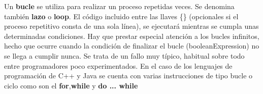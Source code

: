 Un \textbf{bucle} se utiliza para realizar un proceso repetidas veces. Se denomina también \textbf{lazo} o \textbf{loop}. El
código incluido entre las llaves \{\} (opcionales si el proceso repetitivo consta de una sola línea), se
ejecutará mientras se cumpla unas determinadas condiciones. Hay que prestar especial atención a
los bucles infinitos, hecho que ocurre cuando la condición de finalizar el bucle
(booleanExpression) no se llega a cumplir nunca. Se trata de un fallo muy típico, habitual sobre
todo entre programadores poco experimentados. En el caso de los lenguajes de programación de C++ y Java se cuenta con varias instrucciones de tipo bucle o ciclo como son el \textbf{for},\textbf{while} y \textbf{do ... while}